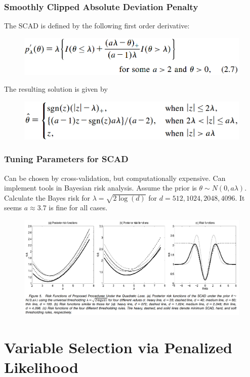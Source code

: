 \documentclass{beamer}
\begin{document}
	\begin{frame}
		\frametitle{Smoothly Clipped Absolute Deviation Penalty}
		The SCAD is defined by the following first order derivative:
		\begin{figure}
			\includegraphics[width=0.7\linewidth]{image007.png}
		\end{figure}
		The resulting solution is given by
		\begin{figure}
			\includegraphics[width=0.7\linewidth]{image008.png}
		\end{figure}
	\end{frame}
	
	\begin{frame}
		\frametitle{Tuning Parameters for SCAD}
		Can be chosen by cross-validation, but computationally expensive. Can implement tools in Bayesian risk analysis. Assume the prior is $\theta \sim N(0, a\lambda)$. Calculate the Bayes risk for $\lambda = \sqrt{2\log(d)}$ for $d = 512, 1024, 2048, 4096$. It seems $a\approx 3.7$ is fine for all cases.
		\begin{figure}
			\includegraphics[width=0.9\linewidth]{image006.png}
		\end{figure}
	\end{frame}
	
	\section{Variable Selection via Penalized Likelihood}
	
\end{document}
